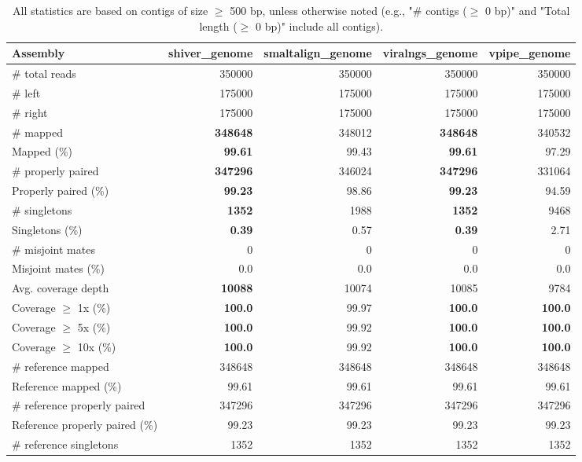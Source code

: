 \documentclass[12pt,a4paper]{article}
\begin{document}
\begin{table}[ht]
\begin{center}
\caption{All statistics are based on contigs of size $\geq$ 500 bp, unless otherwise noted (e.g., "\# contigs ($\geq$ 0 bp)" and "Total length ($\geq$ 0 bp)" include all contigs).}
\begin{tabular}{|l*{4}{|r}|}
\hline
Assembly & shiver\_genome & smaltalign\_genome & viralngs\_genome & vpipe\_genome \\ \hline
\# total reads & 350000 & 350000 & 350000 & 350000 \\ \hline
\# left & 175000 & 175000 & 175000 & 175000 \\ \hline
\# right & 175000 & 175000 & 175000 & 175000 \\ \hline
\# mapped & {\bf 348648} & 348012 & {\bf 348648} & 340532 \\ \hline
Mapped (\%) & {\bf 99.61} & 99.43 & {\bf 99.61} & 97.29 \\ \hline
\# properly paired & {\bf 347296} & 346024 & {\bf 347296} & 331064 \\ \hline
Properly paired (\%) & {\bf 99.23} & 98.86 & {\bf 99.23} & 94.59 \\ \hline
\# singletons & {\bf 1352} & 1988 & {\bf 1352} & 9468 \\ \hline
Singletons (\%) & {\bf 0.39} & 0.57 & {\bf 0.39} & 2.71 \\ \hline
\# misjoint mates & 0 & 0 & 0 & 0 \\ \hline
Misjoint mates (\%) & 0.0 & 0.0 & 0.0 & 0.0 \\ \hline
Avg. coverage depth & {\bf 10088} & 10074 & 10085 & 9784 \\ \hline
Coverage $\geq$ 1x (\%) & {\bf 100.0} & 99.97 & {\bf 100.0} & {\bf 100.0} \\ \hline
Coverage $\geq$ 5x (\%) & {\bf 100.0} & 99.92 & {\bf 100.0} & {\bf 100.0} \\ \hline
Coverage $\geq$ 10x (\%) & {\bf 100.0} & 99.92 & {\bf 100.0} & {\bf 100.0} \\ \hline
\# reference mapped & 348648 & 348648 & 348648 & 348648 \\ \hline
Reference mapped (\%) & 99.61 & 99.61 & 99.61 & 99.61 \\ \hline
\# reference properly paired & 347296 & 347296 & 347296 & 347296 \\ \hline
Reference properly paired (\%) & 99.23 & 99.23 & 99.23 & 99.23 \\ \hline
\# reference singletons & 1352 & 1352 & 1352 & 1352 \\ \hline

\end{tabular}
\end{center}
\end{table}
\end{document}

